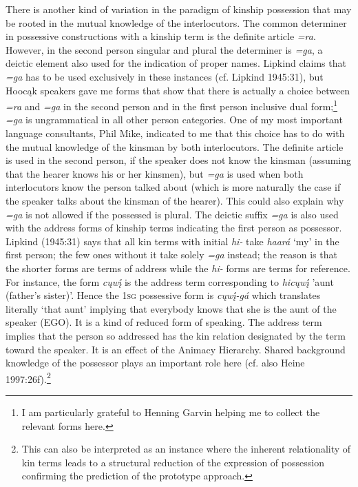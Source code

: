 \documentclass[output=paper]{LSP/langsci}
\begin{document}
There is another kind of variation in the paradigm of kinship possession that may be rooted in the mutual knowledge of the interlocutors. The common determiner in possessive constructions with a kinship term is the definite article \textit{=ra}. However, in the second person singular and plural the determiner is \textit{=ga}, a deictic element also used for the indication of proper names. Lipkind claims that \textit{=ga} has to be used exclusively in these instances (cf. Lipkind 1945:31), but Hoocąk speakers gave me forms that show that there is actually a choice between \textit{=ra} and \textit{=ga} in the second person and in the first person inclusive dual form;\footnote{I am particularly grateful to Henning Garvin helping me to collect the relevant forms here.} \textit{=ga} is ungrammatical in all other person categories. One of my most important language consultants, Phil Mike, indicated to me that this choice has to do with the mutual knowledge of the kinsman by both interlocutors. The definite article is used in the second person, if the speaker does not know the kinsman (assuming that the hearer knows his or her kinsmen), but \textit{=ga} is used when both interlocutors know the person talked about (which is more naturally the case if the speaker talks about the kinsman of the hearer). This could also explain why \textit{=ga} is not allowed if the possessed is plural. The deictic suffix \textit{=ga} is also used with the address forms of kinship terms indicating the first person as possessor. Lipkind (1945:31) says that all kin terms with initial \textit{hi-} take \textit{haará} `my' in the first person; the few ones without it take solely \textit{=ga} instead; the reason is that the shorter forms are terms of address while the \textit{hi-} forms are terms for reference. For instance, the form \textit{cųwį́} is the address term corresponding to \textit{hicųwį́} 'aunt (father's sister)'. Hence the \textsc{1sg} possessive form is \textit{cųwį́-gá} which translates literally `that aunt' implying that everybody knows that she is the aunt of the speaker (EGO). It is a kind of reduced form of speaking. The address term implies that the person so addressed has the kin relation designated by the term toward the speaker. It is an effect of the Animacy Hierarchy. Shared background knowledge of the possessor plays an important role here (cf. also Heine 1997:26f).\footnote{This can also be interpreted as an instance where the inherent relationality of kin terms leads to a structural reduction of the expression of possession confirming the prediction of the prototype approach.}
\end{document}
